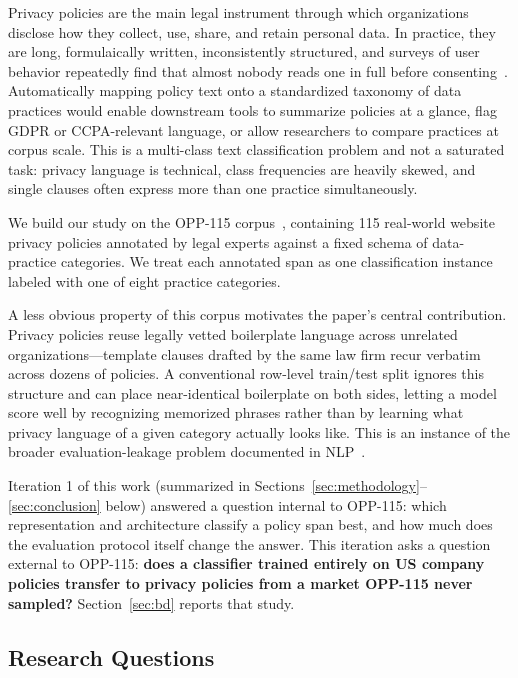 \documentclass[11pt]{article}
\begin{document}
Privacy policies are the main legal instrument through which organizations disclose how they collect, use, share, and retain personal data. In practice, they are long, formulaically written, inconsistently structured, and surveys of user behavior repeatedly find that almost nobody reads one in full before consenting~\cite{mcdonald-cranor-2008-cost}. Automatically mapping policy text onto a standardized taxonomy of data practices would enable downstream tools to summarize policies at a glance, flag GDPR or CCPA-relevant language, or allow researchers to compare practices at corpus scale. This is a multi-class text classification problem and not a saturated task: privacy language is technical, class frequencies are heavily skewed, and single clauses often express more than one practice simultaneously.

We build our study on the OPP-115 corpus~\cite{wilson-etal-2016-creation}, containing 115 real-world website privacy policies annotated by legal experts against a fixed schema of data-practice categories. We treat each annotated span as one classification instance labeled with one of eight practice categories.

A less obvious property of this corpus motivates the paper's central contribution. Privacy policies reuse legally vetted boilerplate language across unrelated organizations---template clauses drafted by the same law firm recur verbatim across dozens of policies. A conventional row-level train/test split ignores this structure and can place near-identical boilerplate on both sides, letting a model score well by recognizing memorized phrases rather than by learning what privacy language of a given category actually looks like. This is an instance of the broader evaluation-leakage problem documented in NLP~\cite{gorman-bedrick-2019-need, lewis-etal-2021-question}.

Iteration 1 of this work (summarized in Sections~\ref{sec:methodology}--\ref{sec:conclusion} below) answered a question internal to OPP-115: which representation and architecture classify a policy span best, and how much does the evaluation protocol itself change the answer. This iteration asks a question external to OPP-115: \textbf{does a classifier trained entirely on US company policies transfer to privacy policies from a market OPP-115 never sampled?} Section~\ref{sec:bd} reports that study.

\subsection{Research Questions}
\end{document}
